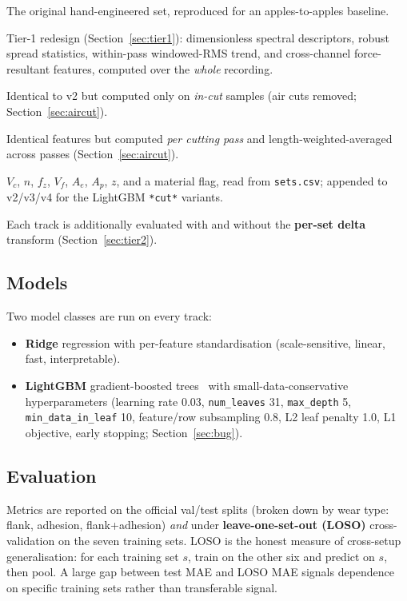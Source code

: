 \documentclass[11pt,a4paper]{article}
\newcommand{\code}[1]{\texttt{#1}}
\begin{document}
\begin{description}[style=nextline,labelindent=0pt,leftmargin=2em]
\item[v1 (40 features)] The original hand-engineered set, reproduced for an
    apples-to-apples baseline.
\item[v2 (85 features)] Tier-1 redesign (Section~\ref{sec:tier1}): dimensionless
    spectral descriptors, robust spread statistics, within-pass windowed-RMS
    trend, and cross-channel force-resultant features, computed over the
    \emph{whole} recording.
\item[v3 (85 features)] Identical to v2 but computed only on \emph{in-cut}
    samples (air cuts removed; Section~\ref{sec:aircut}).
\item[v4 (85 features)] Identical features but computed \emph{per cutting pass}
    and length-weighted-averaged across passes (Section~\ref{sec:aircut}).
\item[cutting params (8 features)] $V_c$, $n$, $f_z$, $V_f$, $A_e$, $A_p$, $z$,
    and a material flag, read from \code{sets.csv}; appended to v2/v3/v4 for the
    LightGBM \code{*cut*} variants.
\end{description}

Each track is additionally evaluated with and without the \textbf{per-set
delta} transform (Section~\ref{sec:tier2}).

\subsection{Models}
Two model classes are run on every track:
\begin{itemize}
\item \textbf{Ridge} regression with per-feature standardisation (scale-sensitive,
    linear, fast, interpretable).
\item \textbf{LightGBM} gradient-boosted trees~\cite{ke2017lightgbm} with small-data-conservative
    hyperparameters (learning rate 0.03, \code{num\_leaves} 31, \code{max\_depth}
    5, \code{min\_data\_in\_leaf} 10, feature/row subsampling 0.8, L2 leaf
    penalty 1.0, L1 objective, early stopping; Section~\ref{sec:bug}).
\end{itemize}

\subsection{Evaluation}
Metrics are reported on the official val/test splits (broken down by wear type:
flank, adhesion, flank+adhesion) \emph{and} under \textbf{leave-one-set-out
(LOSO)} cross-validation on the seven training sets. LOSO is the honest measure
of cross-setup generalisation: for each training set $s$, train on the other
six and predict on $s$, then pool. A large gap between test MAE and LOSO MAE
signals dependence on specific training sets rather than transferable signal.
\end{document}
